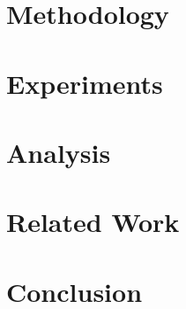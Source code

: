 \documentclass{article} %
\begin{document}
\section{Methodology}
\label{sec:Method}



\section{Experiments}
\label{sec:Experiments}


\section{Analysis}
\label{sec:Analysis}


\section{Related Work}
\label{sec:related}


\section{Conclusion}
\label{sec:conclusion}





\appendix

\end{document}
